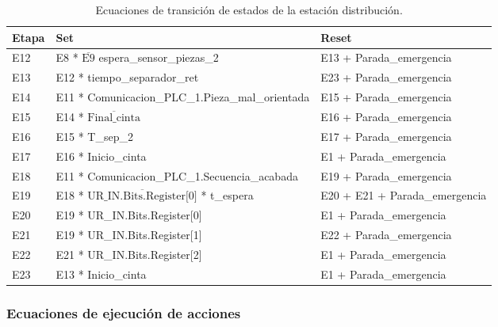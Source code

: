 \begin{table}[H]
\begin{center}

\renewcommand{\arraystretch}{1.5}
\begin{tabular}{|M{1.5cm}|M{6cm}|M{6cm}|}
\hline
\textbf{Etapa} & 
\textbf{Set} & 
\textbf{Reset} \\
\hline
E12  &  E8 * $\overline{\text{E9}}$ espera\_sensor\_piezas\_2 & E13 + Parada\_emergencia \\
\hline
E13  &  E12 * tiempo\_separador\_ret & E23 + Parada\_emergencia \\
\hline
E14  &  E11 *  Comunicacion\_PLC\_1.Pieza\_mal\_orientada & E15 + Parada\_emergencia \\
\hline
E15  &  E14 * $\overline{\text{Final\_cinta}}$ & E16 + Parada\_emergencia \\
\hline
E16  &  E15 * T\_sep\_2 & E17 + Parada\_emergencia \\
\hline
E17  &  E16 * Inicio\_cinta & E1 + Parada\_emergencia \\
\hline
E18  &  E11 *  Comunicacion\_PLC\_1.Secuencia\_acabada & E19 + Parada\_emergencia \\
\hline
E19  &  E18 * $\overline{\text{UR\_IN.Bits.Register[0]}}$  * t\_espera & E20 + E21 + Parada\_emergencia \\
\hline
E20  &  E19 * UR\_IN.Bits.Register[0] & E1 + Parada\_emergencia \\
\hline
E21  &  E19 * UR\_IN.Bits.Register[1] & E22 + Parada\_emergencia \\
\hline
E22  &  E21 * UR\_IN.Bits.Register[2] & E1 + Parada\_emergencia \\
\hline
E23  &  E13 * Inicio\_cinta & E1 + Parada\_emergencia \\
\hline

\end{tabular}

\caption{Ecuaciones de transición de estados de la estación distribución.}
\label{cuadro:transiciones_distribucion_2}
\end{center}
\end{table}

\subsubsection{Ecuaciones de ejecución de acciones}

